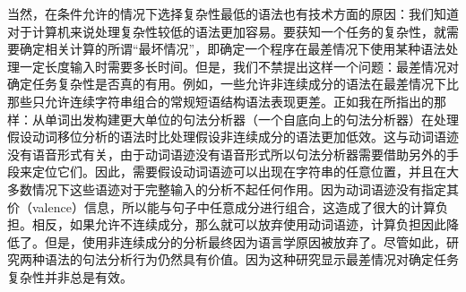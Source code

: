     当然，在条件允许的情况下选择复杂性最低的语法也有技术方面的原因：我们知道对于计算机来说处理复杂性较低的语法更加容易。要获知一个任务的复杂性，就需要确定相关计算的所谓“最坏情况”，即确定一个程序在最差情况下使用某种语法处理一定长度输入时需要多长时间。但是，我们不禁提出这样一个问题：最差情况对确定任务复杂性是否真的有用。例如，一些允许非连续成分的语法在最差情况下比那些只允许连续字符串组合的常规短语结构语法表现更差\citep[Section~8]{Reape91}。正如我在所指出的那样：从单词出发构建更大单位的句法分析器（一个自底向上的句法分析器）在处理假设动词移位分析的语法时比处理假设非连续成分的语法更加低效。这与动词语迹没有语音形式有关，由于动词语迹没有语音形式所以句法分析器需要借助另外的手段来定位它们。因此，需要假设动词语迹可以出现在字符串的任意位置，并且在大多数情况下这些语迹对于完整输入的分析不起任何作用。因为动词语迹没有指定其价（valence）信息，所以能与句子中任意成分进行组合，这造成了很大的计算负担。相反，如果允许不连续成分，那么就可以放弃使用动词语迹，计算负担因此降低了。但是，使用非连续成分的分析最终因为语言学原因被放弃了\citep{Mueller2005c,Mueller2005d,MuellerLehrbuch1,MuellerGS}。尽管如此，研究两种语法的句法分析行为仍然具有价值。因为这种研究显示最差情况对确定任务复杂性并非总是有效。
